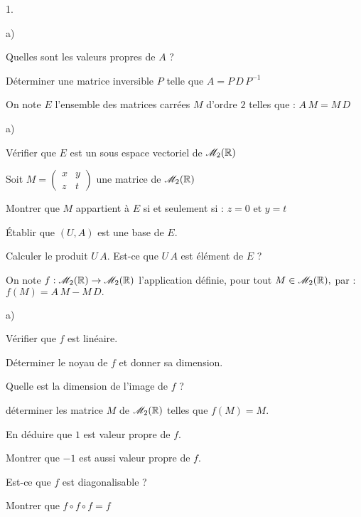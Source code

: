 \documentclass[11pt]{article}%
\begin{document}
\begin{noliste}{1.}
 \setlength{\itemsep}{4mm}
\item 
\begin{noliste}{a)}
 \setlength{\itemsep}{2mm}
\item Quelles sont les valeurs propres de $A$ ?

\item Déterminer une matrice inversible $P$ telle que $A =
P\,D\,P^{-1}$
\end{noliste}

\hspace{-1cm}On note $E$ l'ensemble des matrices carrées $M$ d'ordre
$2$
telles que : $A\,M = M\,D$

\item 
\begin{noliste}{a)}
 \setlength{\itemsep}{2mm}
\item Vérifier que $E$ est un sous espace vectoriel de $\mathscr{M}_{2}(\mathbb{R}) $

\item Soit $M = \left( 
\begin{array}{cc}
x & y \\
z & t
\end{array}
\right) $ une matrice de $\mathscr{M}_{2}(\mathbb{R}) $

Montrer que $M$ appartient à $E$ si et seulement si : $z = 0$ et $y =
t$

\item Établir que $\left( U,A\right) $ est une base de $E.$

\item Calculer le produit $U\,A.$ Est-ce que $U\,A$ est élément de $E $
?
\end{noliste}

\item On note $f :\mathscr{M}_{2}(\mathbb{R}) \rightarrow 
\mathscr{M}_{2}(\mathbb{R}) $ l'application définie, pour
tout $M\in \mathscr{M}_{2}(\mathbb{R}),$ par :\\
$f\left( M\right) = A\,M-M\,D.$

\begin{noliste}{a)}
 \setlength{\itemsep}{2mm}
\item Vérifier que $f$ est linéaire.

\item Déterminer le noyau de $f$ et donner sa dimension.

\item Quelle est la dimension de l'image de $f$ ?

\item déterminer les matrice $M$ de $\mathscr{M}_{2}(\mathbb{R}) $ telles que $f\left(
M\right) = M.$

En déduire que $1$ est valeur propre de $f.$

Montrer que $-1$ est aussi valeur propre de $f.$

\item Est-ce que $f$ est diagonalisable ?

\item Montrer que $f\circ f\circ f = f$
\end{noliste}
\end{noliste}
\end{document}
